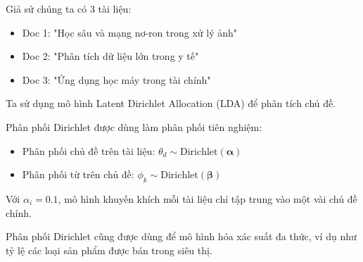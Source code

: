 Giả sử chúng ta có 3 tài liệu:

\begin{itemize}
  \item Doc 1: "Học sâu và mạng nơ-ron trong xử lý ảnh"
  \item Doc 2: "Phân tích dữ liệu lớn trong y tế"
  \item Doc 3: "Ứng dụng học máy trong tài chính"
\end{itemize}

Ta sử dụng mô hình Latent Dirichlet Allocation (LDA) để phân tích chủ đề.

Phân phối Dirichlet được dùng làm phân phối tiên nghiệm:

\begin{itemize}
  \item Phân phối chủ đề trên tài liệu: $\theta_d \sim \text{Dirichlet}(\boldsymbol{\alpha})$
  \item Phân phối từ trên chủ đề: $\phi_k \sim \text{Dirichlet}(\boldsymbol{\beta})$
\end{itemize}

Với $\alpha_i = 0.1$, mô hình khuyến khích mỗi tài liệu chỉ tập trung vào một vài chủ đề chính.

Phân phối Dirichlet cũng được dùng để mô hình hóa xác suất đa thức, ví dụ như tỷ lệ các loại sản phẩm được bán trong siêu thị.
